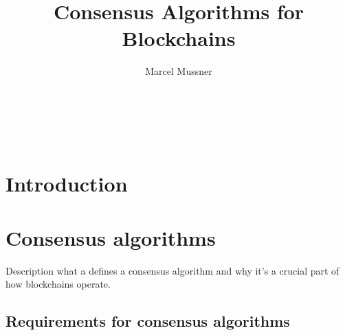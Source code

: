 \documentclass{acm_proc_article-sp}
\begin{document}
\title{Consensus Algorithms for Blockchains}

\author{Marcel Mussner\\
       \\
       \\
       \\
       \\
}

\maketitle


\begin{abstract}


\end{abstract}




\section{Introduction}




\section{Consensus algorithms}

Description what a defines a consensus algorithm and why it's a crucial part of how blockchains operate.


\subsection{Requirements for consensus algorithms}
\end{document}
